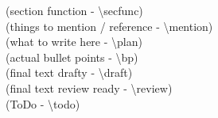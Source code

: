 \documentclass[twoside]{\myrootdir/zyx/mythesis}
\newcommand{\secfunc}[1]{{\color{magenta}(#1)}}
\newcommand{\mention}[1]{{\color{cyan}(#1)}}
\newcommand{\plan}[1]{{\color{purple}(#1)}}
\newcommand{\bp}[1]{{\color{violet}(#1)}}
\newcommand{\draft}[1]{{\color{blue}(#1)}}
\newcommand{\review}[1]{{\color{black}(#1)}}
\newcommand{\todo}[1]{{\color{orange}(#1)}}
\begin{document}



\secfunc{section function - \textbackslash secfunc} \\
\mention{things to mention / reference - \textbackslash mention} \\
\plan{what to write here - \textbackslash plan} \\
\bp{actual bullet points - \textbackslash bp} \\
\draft{final text drafty - \textbackslash draft} \\
\review{final text review ready - \textbackslash review} \\
\todo{ToDo - \textbackslash todo} \\



% 



\cleardoublepage
\appendix
%

\end{document}
